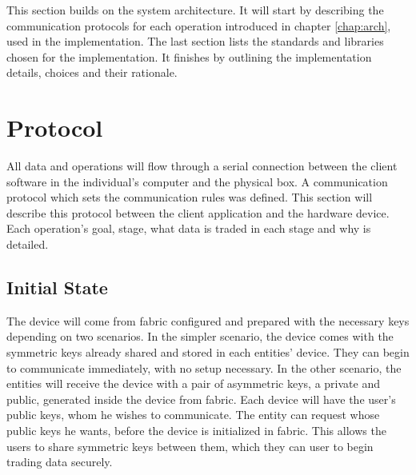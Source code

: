 \cleardoublepage
\label{chap:implementation}

This section builds on the system architecture. It will start by describing the communication protocols for each operation introduced in chapter \ref{chap:arch}, used in the implementation. The last section lists the standards and libraries chosen for the implementation. It finishes by outlining the implementation details, choices and their rationale.

\section{Protocol}\label{chap:implementation:protocol}

All data and operations will flow through a serial connection between the client software in the individual's computer and the physical box. A communication protocol which sets the communication rules was defined.
This section will describe this protocol between the client application and the hardware device. Each operation's goal, stage, what data is traded in each stage and why is detailed.

\subsection{Initial State}\label{chap:implementation:protocol:initial-state}

The device will come from fabric configured and prepared with the necessary keys depending on two scenarios. In the simpler scenario, the device comes with the symmetric keys already shared and stored in each entities' device. They can begin to communicate immediately, with no setup necessary.
In the other scenario, the entities will receive the device with a pair of asymmetric keys, a private and public, generated inside the device from fabric. Each device will have the user's public keys, whom he wishes to communicate. The entity can request whose public keys he wants, before the device is initialized in fabric. This allows the users to share symmetric keys between them, which they can user to begin trading data securely.

